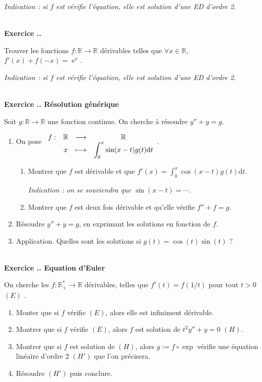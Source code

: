 \documentclass{article}
\newcommand{\fonction}[5]{\raisebox{-0.5\baselineskip}{$\begin{array}{lccc}
    #1: & #2 & \longrightarrow & #3 \\
        & #4 & \longmapsto & #5 \end{array}$}}
\newcommand{\di}{\mathrm{d}}
\newcommand{\ex}{{\operatorname{e}}}
\newcommand{\mb}[1]{\mathbb{#1}}
\newcounter{exo}
\newcommand{\exercice}[1][\null]{\textbf{\\ Exercice \thesection.\theexo. #1} \addtocounter{exo}{1}}
\begin{document}
\emph{Indication : si $f$ est vérifie l'équation, elle est solution d'une ED d'ordre 2.}



\exercice

Trouver les fonctions $f : \mb{R} \rightarrow \mb{R}$ dérivables telles que $\forall x \in \mb{R}$, $f'(x) + f(-x) = \ex^x$.

\emph{Indication : si $f$ est vérifie l'équation, elle est solution d'une ED d'ordre 2.}



\exercice[Résolution générique]

Soit $g : \mb{R} \rightarrow \mb{R}$ une fonction continue. On cherche à résoudre $y'' + y = g$.

\begin{enumerate}

\item  On pose $\fonction{f}{\mb{R}}{\mb{R}}{x}{\displaystyle \int_0^x \sin(x-t) g(t) \di t}$.

\begin{enumerate}
\item Montrer que $f$ est dérivable et que $f'(x) =  \displaystyle \int_0^x \cos(x-t) g(t) \di t$.

\emph{Indication : on se souviendra que $\sin(x-t) = \cdots$.}

\item Montrer que $f$ est deux fois dérivable et qu'elle vérifie $f'' + f = g$.


\end{enumerate}

\item Résoudre $y'' + y = g$, en exprimant les solutions en fonction de $f$.

\item Application. Quelles sont les solutions si $g(t) = \cos(t) \sin(t)$ ? 

\end{enumerate}


\exercice[Equation d'Euler]

On cherche les $f : \mb{R}_+^* \rightarrow \mb{R}$ dérivables, telles que $f'(t) = f(1/t)$ pour tout $t>0$ $(E)$ .

\begin{enumerate}

\item Monter que si $f$ vérifie $(E)$, alors elle est infiniment dérivable.

\item Montrer que si $f$ vérifie $(E)$, alors $f$ est solution de $t^2 y'' + y = 0$ $(H)$.

\item Montrer que si $f$ est solution de $(H)$, alors $g := f \circ \exp$ vérifie une équation linéaire d'ordre 2 $(H')$ que l'on précisera.

\item Résoudre $(H')$ puis conclure.

\end{enumerate}
\end{document}
